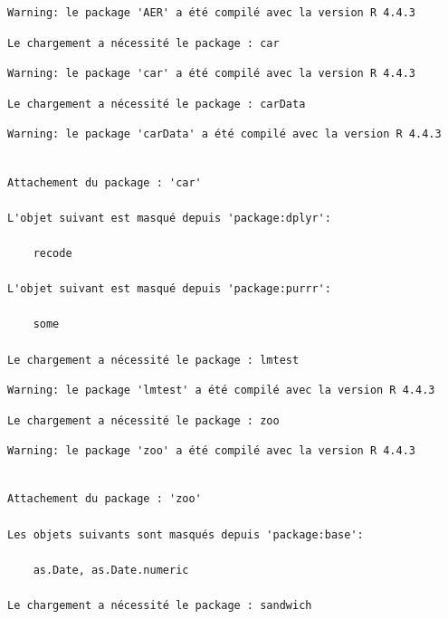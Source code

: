 \documentclass[
  letterpaper,
  DIV=11,
  numbers=noendperiod]{scrartcl}
\begin{document}
\begin{verbatim}
Warning: le package 'AER' a été compilé avec la version R 4.4.3
\end{verbatim}

\begin{verbatim}
Le chargement a nécessité le package : car
\end{verbatim}

\begin{verbatim}
Warning: le package 'car' a été compilé avec la version R 4.4.3
\end{verbatim}

\begin{verbatim}
Le chargement a nécessité le package : carData
\end{verbatim}

\begin{verbatim}
Warning: le package 'carData' a été compilé avec la version R 4.4.3
\end{verbatim}

\begin{verbatim}

Attachement du package : 'car'

L'objet suivant est masqué depuis 'package:dplyr':

    recode

L'objet suivant est masqué depuis 'package:purrr':

    some

Le chargement a nécessité le package : lmtest
\end{verbatim}

\begin{verbatim}
Warning: le package 'lmtest' a été compilé avec la version R 4.4.3
\end{verbatim}

\begin{verbatim}
Le chargement a nécessité le package : zoo
\end{verbatim}

\begin{verbatim}
Warning: le package 'zoo' a été compilé avec la version R 4.4.3
\end{verbatim}

\begin{verbatim}

Attachement du package : 'zoo'

Les objets suivants sont masqués depuis 'package:base':

    as.Date, as.Date.numeric

Le chargement a nécessité le package : sandwich
\end{verbatim}
\end{document}
